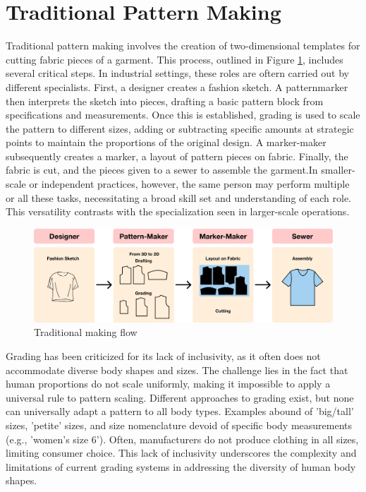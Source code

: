 \section{Traditional Pattern Making}
Traditional pattern making involves the creation of two-dimensional templates for cutting fabric pieces of a garment. This process, outlined in Figure \ref{fig:traditional_making_flow}, includes several critical steps. In industrial settings, these roles are oftern carried out by different specialists. First, a designer creates a fashion sketch. A patternmarker then interprets the sketch into pieces, drafting a basic pattern block from specifications and measurements. Once this is established, grading is used to scale the pattern to different sizes, adding or subtracting specific amounts at strategic points to maintain the proportions of the original design. A marker-maker subsequently creates a marker, a layout of pattern pieces on fabric. Finally, the fabric is cut, and the pieces given to a sewer to assemble the garment.In smaller-scale or independent practices, however, the same person may perform multiple or all these tasks, necessitating a broad skill set and understanding of each role. This versatility contrasts with the specialization seen in larger-scale operations.
\begin{figure} [H]
    \centering
    \includegraphics[width=\textwidth]{Images/traditional process diagram.png}
    \caption{Traditional making flow}
    \label{fig:traditional_making_flow}
\end{figure}
Grading has been criticized for its lack of inclusivity, as it often does not accommodate diverse body shapes and sizes. The challenge lies in the fact that human proportions do not scale uniformly, making it impossible to apply a universal rule to pattern scaling. Different approaches to grading exist, but none can universally adapt a pattern to all body types. Examples abound of 'big/tall' sizes, 'petite' sizes, and size nomenclature devoid of specific body measurements (e.g., 'women's size 6'). Often, manufacturers do not produce clothing in all sizes, limiting consumer choice. This lack of inclusivity underscores the complexity and limitations of current grading systems in addressing the diversity of human body shapes.

